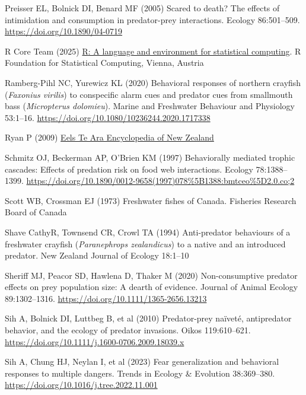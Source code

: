 \documentclass[
  letterpaper,
  DIV=11,
  numbers=noendperiod]{scrartcl}
\newlength{\cslhangindent}
\newenvironment{CSLReferences}[2] %
 {\begin{list}{}{%
  \setlength{\itemindent}{0pt}
  \setlength{\leftmargin}{0pt}
  \setlength{\parsep}{0pt}
  \ifodd #1
   \setlength{\leftmargin}{\cslhangindent}
   \setlength{\itemindent}{-1\cslhangindent}
  \fi
  \setlength{\itemsep}{#2\baselineskip}}}
 {\end{list}}
\begin{document}
\begin{CSLReferences}{1}{1}
Preisser EL, Bolnick DI, Benard MF (2005) Scared to death? The effects
of intimidation and consumption in predator-prey interactions. Ecology
86:501--509. \url{https://doi.org/10.1890/04-0719}

R Core Team (2025) \href{https://www.R-project.org/}{{R}: A language and
environment for statistical computing}. R Foundation for Statistical
Computing, Vienna, Austria

Ramberg-Pihl NC, Yurewicz KL (2020) Behavioral responses of northern
crayfish ({\emph{Faxonius virilis}}) to conspecific alarm cues and
predator cues from smallmouth bass ({\emph{Micropterus dolomieu}}).
Marine and Freshwater Behaviour and Physiology 53:1--16.
\url{https://doi.org/10.1080/10236244.2020.1717338}

Ryan P (2009) \href{https://teara.govt.nz/en/eels}{Eels \textbar{} {Te
Ara Encyclopedia of New Zealand}}

Schmitz OJ, Beckerman AP, O'Brien KM (1997) Behaviorally mediated
trophic cascades: Effects of predation risk on food web interactions.
Ecology 78:1388--1399.
\url{https://doi.org/10.1890/0012-9658(1997)078\%5B1388:bmtceo\%5D2.0.co;2}

Scott WB, Crossman EJ (1973) Freshwater fishes of {Canada}. Fisheries
Research Board of Canada

Shave CathyR, Townsend CR, Crowl TA (1994) Anti-predator behaviours of a
freshwater crayfish ({\emph{Paranephrops zealandicus}}) to a native and
an introduced predator. New Zealand Journal of Ecology 18:1--10

Sheriff MJ, Peacor SD, Hawlena D, Thaker M (2020) Non-consumptive
predator effects on prey population size: A dearth of evidence. Journal
of Animal Ecology 89:1302--1316.
\url{https://doi.org/10.1111/1365-2656.13213}

Sih A, Bolnick DI, Luttbeg B, et al (2010) Predator-prey naïveté,
antipredator behavior, and the ecology of predator invasions. Oikos
119:610--621. \url{https://doi.org/10.1111/j.1600-0706.2009.18039.x}

Sih A, Chung HJ, Neylan I, et al (2023) Fear generalization and
behavioral responses to multiple dangers. Trends in Ecology \& Evolution
38:369--380. \url{https://doi.org/10.1016/j.tree.2022.11.001}


\end{CSLReferences}
\end{document}
